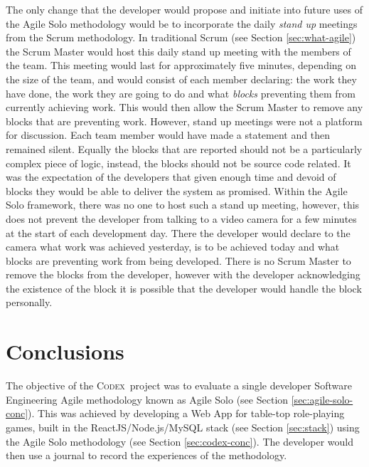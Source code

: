 \documentclass[final]{cmpreport}
\newcommand{\Codex}{\textsc{Codex}}
\begin{document}
		The only change that the developer would propose and initiate into future uses of the Agile Solo methodology would be to incorporate the daily \emph{stand up} meetings from the Scrum methodology. In traditional Scrum (see Section \ref{sec:what-agile}) the Scrum Master would host this daily stand up meeting with the members of the team. This meeting would last for approximately five minutes, depending on the size of the team, and would consist of each member declaring: the work they have done, the work they are going to do and what \emph{blocks} preventing them from currently achieving work. This would then allow the Scrum Master to remove any blocks that are preventing work. However, stand up meetings were not a platform for discussion. Each team member would have made a statement and then remained silent. Equally the blocks that are reported should not be a particularly complex piece of logic, instead, the blocks should not be source code related. It was the expectation of the developers that given enough time and devoid of blocks they would be able to deliver the system as promised. Within the Agile Solo framework, there was no one to host such a stand up meeting, however, this does not prevent the developer from talking to a video camera for a few minutes at the start of each development day. There the developer would declare to the camera what work was achieved yesterday, is to be achieved today and what blocks are preventing work from being developed. There is no Scrum Master to remove the blocks from the developer, however with the developer acknowledging the existence of the block it is possible that the developer would handle the block personally. 
			
	\section{Conclusions} \label{sec:conclusions}
	The objective of the \Codex \ project was to evaluate a single developer Software Engineering Agile methodology known as Agile Solo (see Section \ref{sec:agile-solo-conc}). This was achieved by developing a Web App for table-top role-playing games, built in the ReactJS/Node.js/MySQL stack (see Section \ref{sec:stack}) using the Agile Solo methodology (see Section \ref{sec:codex-conc}). The developer would then use a journal to record the experiences of the methodology. 
	
\end{document}
